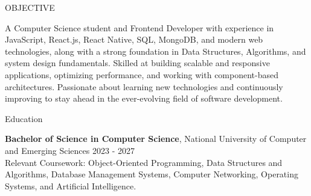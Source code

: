 \documentclass{resume} %
\begin{document}

\begin{rSection}{OBJECTIVE}

A Computer Science student and Frontend Developer with experience in JavaScript, React.js, React Native, SQL, MongoDB, and modern web technologies, along with a strong foundation in Data Structures, Algorithms, and system design fundamentals. Skilled at building scalable and responsive applications, optimizing performance, and working with component-based architectures. Passionate about learning new technologies and continuously improving to stay ahead in the ever-evolving field of software development.

\end{rSection}

\begin{rSection}{Education}

{\bf Bachelor of Science in Computer Science}, National University of Computer and Emerging Sciences \hfill {2023 - 2027}\\
Relevant Coursework: Object-Oriented Programming, Data Structures and Algorithms, Database Management Systems, Computer Networking, Operating Systems, and Artificial Intelligence.

\end{rSection}
\end{document}
